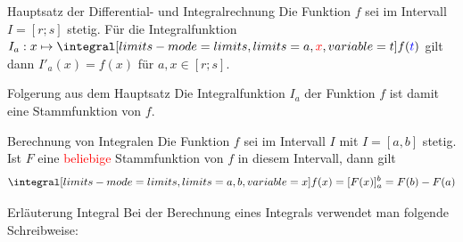 \begin{defi}{Hauptsatz der Differential- und Integralrechnung}{}
    Die Funktion $f$ sei im Intervall $I=[r;s]$ stetig. Für die Integralfunktion $I_a : x \mapsto \integral[limits-mode=limits,
            limits={a, \textcolor{red}{x}},
            variable={t}]{f(\textcolor{blue}{t})}$ gilt dann $I'_a(x) = f(x)$ für $a,x \in [r;s]$.
\end{defi}
 \begin{b8d}{Folgerung aus dem Hauptsatz}{}
Die Integralfunktion $I_a$ der Funktion $f$ ist damit eine Stammfunktion von $f$.
 \end{b8d}
 
 \begin{satz}{Berechnung von Integralen}{}
     Die Funktion $f$ sei im Intervall $I$ mit  $I=[a, b]$ stetig. Ist $F$ eine \textcolor{red}{beliebige} Stammfunktion von $f$ in diesem Intervall, dann gilt
    \textcolor{red}{ $$\integral[limits-mode=limits,
            limits={a, b},
            variable={x}]{f(x)} = [F(x)]_a^b = F(b) - F(a)$$}
 \end{satz}
 \begin{b8d}{Erläuterung Integral}{}
Bei der Berechnung eines Integrals verwendet man folgende Schreibweise:\\
\end{b8d}
